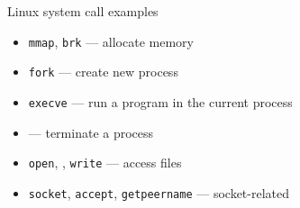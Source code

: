 \begin{frame}{Linux system call examples}
\begin{itemize}
\item {\tt mmap}, {\tt brk} --- allocate memory
\item {\tt fork} --- create new process
\item {\tt execve} --- run a program in the current process
\item {\tt {}} --- terminate a process
\item {\tt open}, {\tt {}}, {\tt write} --- access files
\item {\tt socket}, {\tt accept}, {\tt getpeername} --- socket-related
\end{itemize}
\end{frame}

